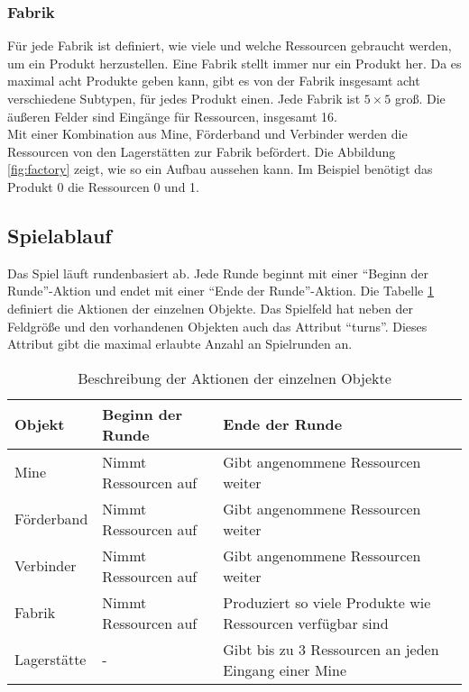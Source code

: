 \subsubsection*{Fabrik}
Für jede Fabrik ist definiert, wie viele und welche Ressourcen gebraucht werden, um ein Produkt herzustellen. Eine Fabrik stellt immer nur ein Produkt her. Da es maximal acht Produkte geben kann, gibt es von der Fabrik insgesamt acht verschiedene Subtypen, für jedes Produkt einen. Jede Fabrik ist $5\times5$ groß. Die äußeren Felder sind Eingänge für Ressourcen, insgesamt 16.
\\
Mit einer Kombination aus Mine, Förderband und Verbinder werden die Ressourcen von den Lagerstätten zur Fabrik befördert. Die Abbildung \ref{fig:factory} zeigt, wie so ein Aufbau aussehen kann. Im Beispiel benötigt das Produkt 0 die Ressourcen 0 und 1.
\newpage
\subsection{Spielablauf}
Das Spiel läuft rundenbasiert ab. Jede Runde beginnt mit einer “Beginn der Runde”-Aktion und endet mit einer “Ende der Runde”-Aktion.
Die Tabelle \ref{tab:object_actions} definiert die Aktionen der einzelnen Objekte. 
Das Spielfeld hat neben der Feldgröße und den vorhandenen Objekten auch das Attribut “turns”. Dieses Attribut gibt die maximal erlaubte Anzahl an Spielrunden an.

\begin{table}[htp]
\begin{center}
\begin{tabular}{ | p{2cm} | p{5cm} | p{}| } 
	\hline
	\textbf{Objekt}& \textbf{Beginn der Runde} & \textbf{Ende der Runde} \\ \hline
	Mine & Nimmt Ressourcen auf & Gibt angenommene Ressourcen weiter \\ \hline
	Förderband & Nimmt Ressourcen auf & Gibt angenommene Ressourcen weiter \\ \hline
	Verbinder & Nimmt Ressourcen auf & Gibt angenommene Ressourcen weiter \\ \hline
	Fabrik & Nimmt Ressourcen auf & Produziert so viele Produkte wie Ressourcen verfügbar sind \\ \hline
	Lagerstätte & - & Gibt bis zu 3 Ressourcen an jeden Eingang einer Mine \\ \hline
\end{tabular}
\caption{Beschreibung der Aktionen der einzelnen Objekte}\label{tab:object_actions}
\end{center}
\end{table}


